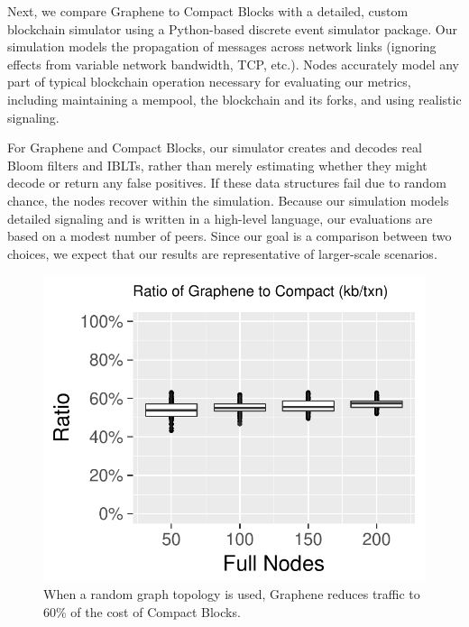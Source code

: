 Next, we compare Graphene to Compact Blocks with a detailed,
custom blockchain simulator using a Python-based discrete event simulator
package. Our simulation models the propagation of messages across
network links (ignoring effects from variable network bandwidth, TCP,
etc.). Nodes accurately model any part of typical blockchain operation
necessary for evaluating our metrics, including maintaining a mempool,
the blockchain and its forks, and using realistic signaling.

For Graphene and Compact Blocks, our simulator creates and decodes real
Bloom filters and IBLTs, rather than merely estimating whether they
might decode or return any false positives. If these data
structures fail due to random chance, the nodes recover within the
simulation. Because our simulation models detailed signaling and is written in a high-level language, our evaluations
are based on a modest number of peers. Since our goal is a
comparison between two choices, we expect that our results are
representative of larger-scale scenarios.

\begin{figure}[t]
 \begin{minipage}{.5\columnwidth}
 \centerline{\includegraphics[width=\columnwidth]{graphs/sim-proto-results-wo-txns}}
\end{minipage}
\begin{minipage}{.4\columnwidth}
  \caption{When a random graph topology is used, Graphene reduces traffic to 60\% of the cost of Compact Blocks.}\label{fig:sim-proto}
  \end{minipage}
\end{figure}

